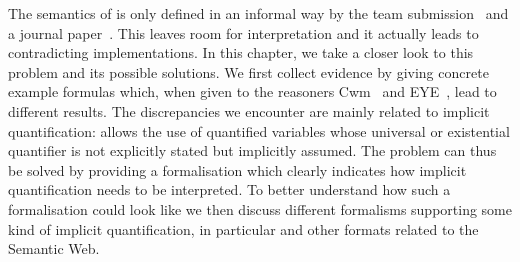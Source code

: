 









The semantics of \nthreelogic is only defined in an informal way by the \wwwc team submission~\cite{Notation3} and a journal paper~\cite{N3Logic}. 
This leaves room for interpretation and it actually leads to contradicting implementations. 
In this chapter, we take a closer look to this problem and its possible solutions. %
We first collect evidence %
by giving concrete example formulas which, when given to the reasoners Cwm~\cite{cwm} and EYE~\cite{eye}, lead to different results. 
The discrepancies we encounter are mainly related to 
implicit quantification: \nthree allows the use of quantified variables whose universal or existential quantifier is not explicitly stated but implicitly assumed.
The problem can thus be solved by providing a formalisation which clearly indicates how implicit quantification needs to be interpreted. To better understand how such a formalisation 
could look like we then discuss different formalisms supporting some kind of implicit quantification, in particular \rdf and other formats related to the Semantic Web.

% 


